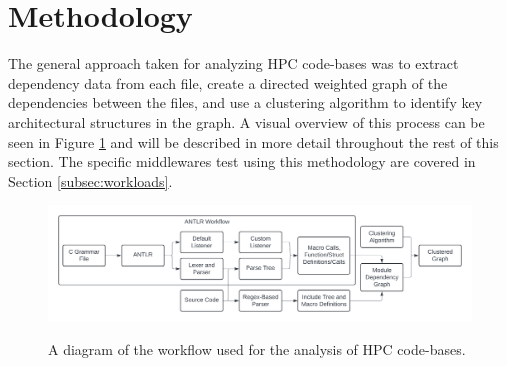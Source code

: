\section{Methodology}
\label{sec:methodology}

The general approach taken for analyzing HPC code-bases was to extract dependency data from each file, create a directed weighted graph of the dependencies between the files, and use a clustering algorithm to identify key architectural structures in the graph. A visual overview of this process can be seen in Figure \ref{fig:workflow} and will be described in more detail throughout the rest of this section. The specific middlewares test using this methodology are covered in Section \ref{subsec:workloads}.

\begin{figure}[ht]
    \centering
    \includegraphics[width=1.0\linewidth]{figures/workflow_diagram.png} \\
    \caption{A diagram of the workflow used for the analysis of HPC code-bases.}
    \label{fig:workflow}
\end{figure}
